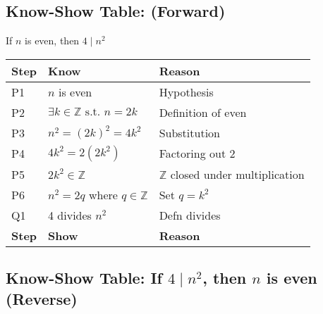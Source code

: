 
\newpage

\subsection{Know-Show Table: (Forward)}

If \( n \) is even, then \( 4 \mid n^2 \)

\begin{center}
    \begin{tabular}{|p{}|p{}|p{}|}
    \hline
    \textbf{Step} & \textbf{Know} & \textbf{Reason} \\
    \hline
        P1 & \( n \) is even & Hypothesis \\
    \hline
        P2 & \( \exists k \in \mathbb{Z} \text{ s.t. } n = 2k \) & Definition of even \\
    \hline
        P3 & \( n^2 = (2k)^2 = 4k^2 \) & Substitution \\
    \hline
        P4 & \( 4k^2 = 2(2k^2) \) & Factoring out \( 2 \) \\
    \hline
        P5 & \( 2k^2 \in \mathbb{Z} \) & \( \mathbb{Z}\) closed under multiplication \\
    \hline
        P6 & \( n^2 = 2q \) where \( q \in \mathbb{Z} \) & Set \( q = k^2 \) \\
    \hline
        Q1 & 4 divides \( n^2 \) & Defn divides \\
    \hline
    \textbf{Step} & \textbf{Show} & \textbf{Reason} \\
    \hline
    \end{tabular}
\end{center}


\subsection{Know-Show Table: If \( 4 \mid n^2 \), then \( n \) is even (Reverse)}

